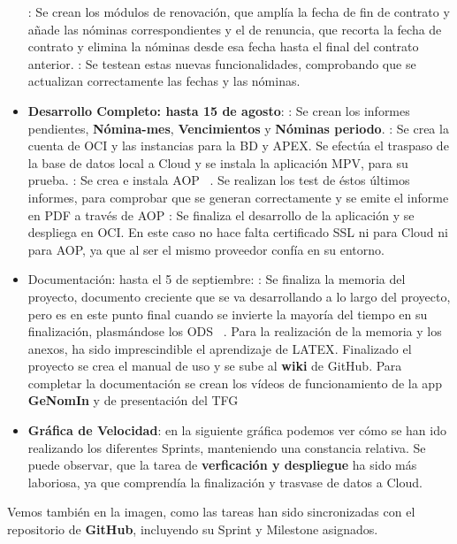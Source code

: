 \begin{itemize}
	: Se crean los módulos de renovación, que amplía la fecha de fin de contrato y añade las nóminas correspondientes y el de renuncia, que recorta la fecha de contrato y elimina la nóminas desde esa fecha hasta el final del contrato anterior.
	: Se testean estas nuevas funcionalidades, comprobando que se actualizan correctamente las fechas y las nóminas.
	\item{\textbf{Desarrollo Completo: hasta 15 de agosto}}:
	: Se crean los informes pendientes, \textbf{Nómina-mes}, \textbf{Vencimientos} y \textbf{Nóminas periodo}.
	: Se crea la cuenta de \acrshort{OCI} y las instancias para la BD y \acrshort{APEX}. Se efectúa el traspaso de la base de datos local a Cloud y se instala la aplicación MPV, para su prueba.
	: Se crea e instala \acrfull{AOP} ~\cite{Oracle-maxParte122021}. Se realizan los test de éstos últimos informes, para comprobar que se generan correctamente y se emite el informe en PDF a través de \acrshort{AOP}
	: Se finaliza el desarrollo de la aplicación y se despliega en \acrshort{OCI}. En este caso no hace falta certificado \acrshort{SSL} ni para Cloud ni para \acrshort{AOP}, ya que al ser el mismo proveedor confía en su entorno.
	\item{Documentación: hasta el 5 de septiembre}: 
	: Se finaliza la memoria del proyecto, documento creciente que se va desarrollando a lo largo del proyecto, pero es en este punto final cuando se invierte la mayoría del tiempo en su finalización, plasmándose los \acrfull{ODS} ~\cite{MarkiegiIntegrandoODSGrado}. Para la realización de la memoria y los anexos, ha sido imprescindible el aprendizaje de \gls{LATEX}. Finalizado el proyecto se crea el manual de uso y se sube al \textbf{wiki} de GitHub.
	Para completar la documentación se crean los vídeos de funcionamiento de la app \textbf{GeNomIn} y de presentación del \acrshort{TFG}
	
	\item{\textbf{Gráfica de Velocidad}}: en la siguiente gráfica podemos ver cómo se han ido realizando los diferentes \gls{Sprint}s, manteniendo una constancia relativa. Se puede observar, que la tarea de \textbf{verficación y despliegue} ha sido más laboriosa, ya que comprendía la finalización y trasvase de datos a Cloud.
\end{itemize}
\clearpage
Vemos también en la imagen, como las tareas han sido sincronizadas con el repositorio de \textbf{GitHub}, incluyendo su \gls{Sprint} y \gls{Milestone} asignados.

